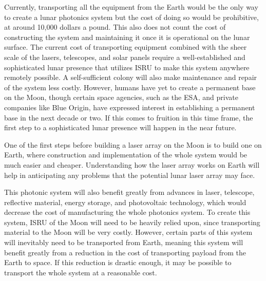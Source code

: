 \documentclass{aa}
\begin{document}
	 Currently, transporting all the equipment from the Earth would be the only way to create a lunar photonics system but the cost of doing so would be prohibitive, at around 10,000 dollars a pound. This also does not count the cost of constructing the system and maintaining it once it is operational on the lunar surface. The current cost of transporting equipment combined with the sheer scale of the lasers, telescopes, and solar panels require a well-established and sophisticated lunar presence that utilizes ISRU to make this system anywhere remotely possible. A self-sufficient colony will also make maintenance and repair of the system less costly. However, humans have yet to create a permanent base on the Moon, though certain space agencies, such as the ESA, and private companies like Blue Origin, have expressed interest in establishing a permanent base in the next decade or two. If this comes to fruition in this time frame, the first step to a sophisticated lunar presence will happen in the near future.
     
     One of the first steps before building a laser array on the Moon is to build one on Earth, where construction and implementation of the whole system would be much easier and cheaper. Understanding how the laser array works on Earth will help in anticipating any problems that the potential lunar laser array may face. 
     
     This photonic system will also benefit greatly from advances in laser, telescope, reflective material, energy storage, and photovoltaic technology, which would decrease the cost of manufacturing the whole photonics system. To create this system, ISRU of the Moon will need to be heavily relied upon, since transporting material to the Moon will be very costly. However, certain parts of this system will inevitably need to be transported from Earth, meaning this system will benefit greatly from a reduction in the cost of transporting payload from the Earth to space. If this reduction is drastic enough, it may be possible to transport the whole system at a reasonable cost.
     
\end{document}

